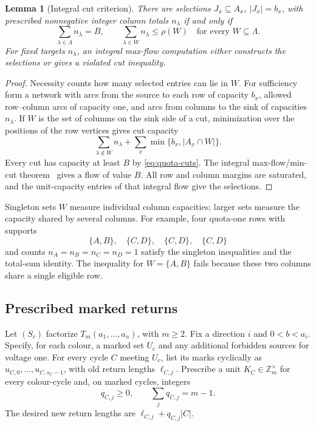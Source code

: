 \documentclass[11pt,reqno]{amsart}
\numberwithin{equation}{section}
\newtheorem{lemma}[theorem]{Lemma}
\theoremstyle{definition}
\theoremstyle{remark}
\newcommand{\Z}{\mathbb Z}
\begin{document}
\begin{lemma}[Integral cut criterion]\label{lem:quota-cuts}
There are selections $J_x\subseteq A_x$, $|J_x|=b_x$, with prescribed
nonnegative integer column totals $n_\lambda$ if and only if
\begin{equation}\label{eq:quota-cuts}
 \sum_{\lambda\in\Lambda}n_\lambda=B,
 \qquad
 \sum_{\lambda\in W}n_\lambda\le\rho(W)
 \quad\text{for every }W\subseteq\Lambda.
\end{equation}
For fixed targets $n_\lambda$, an integral max-flow computation either
constructs the selections or gives a violated cut inequality.
\end{lemma}
\begin{proof}
Necessity counts how many selected entries can lie in $W$.
For sufficiency form a network with arcs from the source to each row
of capacity $b_x$, allowed row--column arcs of capacity one, and arcs
from columns to the sink of capacities $n_\lambda$.
If $W$ is the set of columns on the sink side of a cut, minimization over
the positions of the row vertices gives cut capacity
\[
 \sum_{\lambda\notin W}n_\lambda+
 \sum_x\min\{b_x,|A_x\cap W|\}.
\]
Every cut has capacity at least $B$ by \eqref{eq:quota-cuts}.
The integral max-flow/min-cut theorem~\cite{FF56} gives a flow of value
$B$. All row and column margins are saturated, and the unit-capacity
entries of that integral flow give the selections.
\end{proof}

Singleton sets $W$ measure individual column capacities; larger sets
measure the capacity shared by several columns. For example, four
quota-one rows with
supports
\[
 \{A,B\},\quad\{C,D\},\quad\{C,D\},\quad\{C,D\}
\]
and counts $n_A=n_B=n_C=n_D=1$ satisfy the singleton inequalities and
the total-sum identity. The inequality for $W=\{A,B\}$ fails because
these two columns share a single eligible row.

\subsection{Prescribed marked returns}
Let $(S_c)$ factorize $T_m(a_1,\ldots,a_n)$, with $m\ge2$.
Fix a direction $i$ and $0<b<a_i$. Specify, for each colour, a marked
set $U_c$ and any additional forbidden sources for voltage one.
For every cycle $C$ meeting $U_c$, list its marks cyclically as
$u_{C,0},\ldots,u_{C,s_C-1}$, with old return lengths $\ell_{C,j}$.
Prescribe a unit $K_C\in\Z_m^\times$ for every colour-cycle and, on
marked cycles, integers
\[
 q_{C,j}\ge0,\qquad\sum_jq_{C,j}=m-1.
\]
The desired new return lengths are $\ell_{C,j}+q_{C,j}|C|$.
\end{document}
